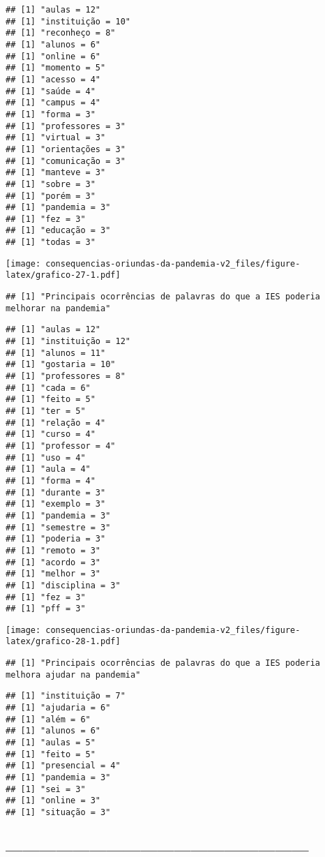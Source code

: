 \documentclass[
]{article}
\begin{document}
\begin{verbatim}
## [1] "aulas = 12"
## [1] "instituição = 10"
## [1] "reconheço = 8"
## [1] "alunos = 6"
## [1] "online = 6"
## [1] "momento = 5"
## [1] "acesso = 4"
## [1] "saúde = 4"
## [1] "campus = 4"
## [1] "forma = 3"
## [1] "professores = 3"
## [1] "virtual = 3"
## [1] "orientações = 3"
## [1] "comunicação = 3"
## [1] "manteve = 3"
## [1] "sobre = 3"
## [1] "porém = 3"
## [1] "pandemia = 3"
## [1] "fez = 3"
## [1] "educação = 3"
## [1] "todas = 3"
\end{verbatim}

\texttt{[image: consequencias-oriundas-da-pandemia-v2\_files/figure-latex/grafico-27-1.pdf]}

\begin{verbatim}
## [1] "Principais ocorrências de palavras do que a IES poderia melhorar na pandemia"
\end{verbatim}

\begin{verbatim}
## [1] "aulas = 12"
## [1] "instituição = 12"
## [1] "alunos = 11"
## [1] "gostaria = 10"
## [1] "professores = 8"
## [1] "cada = 6"
## [1] "feito = 5"
## [1] "ter = 5"
## [1] "relação = 4"
## [1] "curso = 4"
## [1] "professor = 4"
## [1] "uso = 4"
## [1] "aula = 4"
## [1] "forma = 4"
## [1] "durante = 3"
## [1] "exemplo = 3"
## [1] "pandemia = 3"
## [1] "semestre = 3"
## [1] "poderia = 3"
## [1] "remoto = 3"
## [1] "acordo = 3"
## [1] "melhor = 3"
## [1] "disciplina = 3"
## [1] "fez = 3"
## [1] "pff = 3"
\end{verbatim}

\texttt{[image: consequencias-oriundas-da-pandemia-v2\_files/figure-latex/grafico-28-1.pdf]}

\begin{verbatim}
## [1] "Principais ocorrências de palavras do que a IES poderia melhora ajudar na pandemia"
\end{verbatim}

\begin{verbatim}
## [1] "instituição = 7"
## [1] "ajudaria = 6"
## [1] "além = 6"
## [1] "alunos = 6"
## [1] "aulas = 5"
## [1] "feito = 5"
## [1] "presencial = 4"
## [1] "pandemia = 3"
## [1] "sei = 3"
## [1] "online = 3"
## [1] "situação = 3"
\end{verbatim}

\hypertarget{section-1}{%
\subsection{------------------------------------------------------}\label{section-1}}
\end{document}
